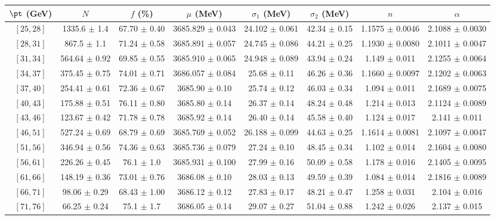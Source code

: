 \begin{tabular}{c||c|c|c|c|c|c|c}
$\pt$ (GeV) & $N$ & $f$ (\%) & $\mu$ (MeV) & $\sigma_1$ (MeV) & $\sigma_2$ (MeV) & $n$ & $\alpha$ \\
\hline
$[25, 28]$ & 1335.6 $\pm$ 1.4 & 67.70 $\pm$ 0.40 & 3685.829 $\pm$ 0.043 & 24.102 $\pm$ 0.061 & 42.34 $\pm$ 0.15 & 1.1575 $\pm$ 0.0046 & 2.1088 $\pm$ 0.0030\\
$[28, 31]$ & 867.5 $\pm$ 1.1 & 71.24 $\pm$ 0.58 & 3685.891 $\pm$ 0.057 & 24.745 $\pm$ 0.086 & 44.21 $\pm$ 0.25 & 1.1930 $\pm$ 0.0080 & 2.1011 $\pm$ 0.0047\\
$[31, 34]$ & 564.64 $\pm$ 0.92 & 69.85 $\pm$ 0.55 & 3685.910 $\pm$ 0.065 & 24.948 $\pm$ 0.089 & 43.94 $\pm$ 0.24 & 1.149 $\pm$ 0.011 & 2.1255 $\pm$ 0.0064\\
$[34, 37]$ & 375.45 $\pm$ 0.75 & 74.01 $\pm$ 0.71 & 3686.057 $\pm$ 0.084 & 25.68 $\pm$ 0.11 & 46.26 $\pm$ 0.36 & 1.1660 $\pm$ 0.0097 & 2.1202 $\pm$ 0.0063\\
$[37, 40]$ & 254.41 $\pm$ 0.61 & 72.36 $\pm$ 0.67 & 3685.90 $\pm$ 0.10 & 25.74 $\pm$ 0.12 & 46.03 $\pm$ 0.34 & 1.094 $\pm$ 0.011 & 2.1689 $\pm$ 0.0075\\
$[40, 43]$ & 175.88 $\pm$ 0.51 & 76.11 $\pm$ 0.80 & 3685.80 $\pm$ 0.14 & 26.37 $\pm$ 0.14 & 48.24 $\pm$ 0.48 & 1.214 $\pm$ 0.013 & 2.1124 $\pm$ 0.0089\\
$[43, 46]$ & 123.67 $\pm$ 0.42 & 71.78 $\pm$ 0.78 & 3685.92 $\pm$ 0.14 & 26.40 $\pm$ 0.14 & 45.58 $\pm$ 0.40 & 1.124 $\pm$ 0.017 & 2.141 $\pm$ 0.011\\
$[46, 51]$ & 527.24 $\pm$ 0.69 & 68.79 $\pm$ 0.69 & 3685.769 $\pm$ 0.052 & 26.188 $\pm$ 0.099 & 44.63 $\pm$ 0.25 & 1.1614 $\pm$ 0.0081 & 2.1097 $\pm$ 0.0047\\
$[51, 56]$ & 346.94 $\pm$ 0.56 & 74.36 $\pm$ 0.63 & 3685.736 $\pm$ 0.079 & 27.24 $\pm$ 0.10 & 48.45 $\pm$ 0.34 & 1.102 $\pm$ 0.014 & 2.1604 $\pm$ 0.0080\\
$[56, 61]$ & 226.26 $\pm$ 0.45 & 76.1 $\pm$ 1.0 & 3685.931 $\pm$ 0.100 & 27.99 $\pm$ 0.16 & 50.09 $\pm$ 0.58 & 1.178 $\pm$ 0.016 & 2.1405 $\pm$ 0.0095\\
$[61, 66]$ & 148.19 $\pm$ 0.36 & 73.01 $\pm$ 0.76 & 3686.08 $\pm$ 0.10 & 28.03 $\pm$ 0.13 & 49.59 $\pm$ 0.39 & 1.084 $\pm$ 0.014 & 2.1816 $\pm$ 0.0089\\
$[66, 71]$ & 98.06 $\pm$ 0.29 & 68.43 $\pm$ 1.00 & 3686.12 $\pm$ 0.12 & 27.83 $\pm$ 0.17 & 48.21 $\pm$ 0.47 & 1.258 $\pm$ 0.031 & 2.104 $\pm$ 0.016\\
$[71, 76]$ & 66.25 $\pm$ 0.24 & 75.1 $\pm$ 1.7 & 3686.05 $\pm$ 0.14 & 29.07 $\pm$ 0.27 & 51.04 $\pm$ 0.88 & 1.242 $\pm$ 0.026 & 2.137 $\pm$ 0.015\\

\end{tabular}
